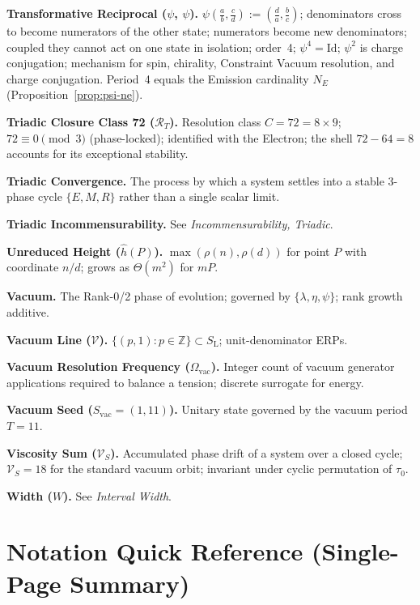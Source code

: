 \documentclass[11pt, letterpaper]{article}
\newcommand{\Z}{\mathbb{Z}}
\newcommand{\SL}{S_{\mathrm{L}}}
\newcommand{\Vac}{\mathcal{V}}
\newcommand{\lop}{\lambda}
\newcommand{\aop}{\eta}
\newcommand{\rank}{\rho}
\newcommand{\VS}{\mathcal{V}_S}
\theoremstyle{definition}
\theoremstyle{plain}
\begin{document}
\medskip\noindent\textbf{Transformative Reciprocal ($\psi$, $\psi$).}
$\psi\!\left(\tfrac{a}{b},\tfrac{c}{d}\right):=\left(\tfrac{d}{a},\tfrac{b}{c}\right)$;
denominators cross to become numerators of the other state; numerators become
new denominators; coupled they cannot act on one state in isolation; order~4;
$\psi^4=\mathrm{Id}$; $\psi^2$ is charge conjugation; mechanism for spin,
chirality, Constraint Vacuum resolution, and charge conjugation.
Period~4 equals the Emission cardinality $N_E$
(Proposition~\ref{prop:psi-ne}).

\medskip\noindent\textbf{Triadic Closure Class 72 ($\mathcal{R}_T$).}
Resolution class $C=72=8\times 9$; $72\equiv 0\pmod 3$ (phase-locked);
identified with the Electron; the shell $72-64=8$ accounts for its
exceptional stability.

\medskip\noindent\textbf{Triadic Convergence.}
The process by which a system settles into a stable 3-phase cycle $\{E,M,R\}$
rather than a single scalar limit.

\medskip\noindent\textbf{Triadic Incommensurability.}
See \textit{Incommensurability, Triadic}.

\medskip\noindent\textbf{Unreduced Height ($\hat{h}(P)$).}
$\max(\rank(n),\rank(d))$ for point $P$ with coordinate $n/d$; grows as
$\Theta(m^2)$ for $mP$.

\medskip\noindent\textbf{Vacuum.}
The Rank-0/2 phase of evolution; governed by $\{\lop,\aop,\psi\}$; rank
growth additive.

\medskip\noindent\textbf{Vacuum Line ($\Vac$).}
$\{(p,1):p\in\Z\}\subset\SL$; unit-denominator ERPs.

\medskip\noindent\textbf{Vacuum Resolution Frequency ($\Omega_{\mathrm{vac}}$).}
Integer count of vacuum generator applications required to balance a tension;
discrete surrogate for energy.

\medskip\noindent\textbf{Vacuum Seed ($S_{\mathrm{vac}}=(1,11)$).}
Unitary state governed by the vacuum period $T=11$.

\medskip\noindent\textbf{Viscosity Sum ($\VS$).}
Accumulated phase drift of a system over a closed cycle; $\VS=18$ for the
standard vacuum orbit; invariant under cyclic permutation of $\tau_0$.

\medskip\noindent\textbf{Width ($W$).}
See \textit{Interval Width}.

\newpage

\section{Notation Quick Reference (Single-Page Summary)}\label{sec:quickref}
\end{document}
